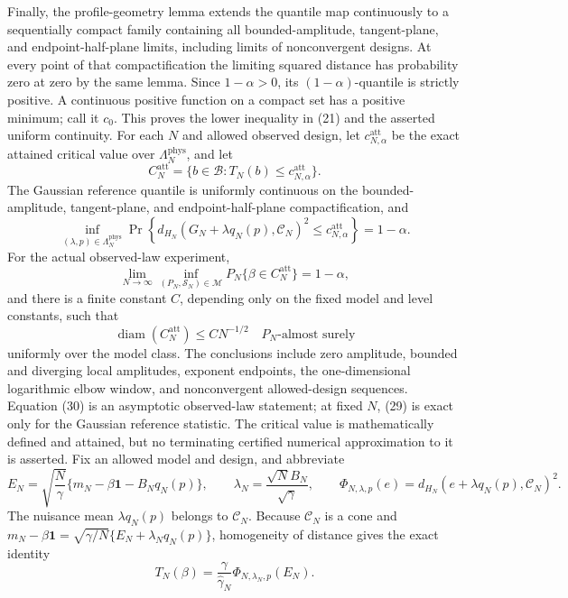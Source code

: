 Finally, the profile-geometry lemma extends the quantile map continuously to a sequentially compact family containing all bounded-amplitude, tangent-plane, and endpoint-half-plane limits, including limits of nonconvergent designs.  At every point of that compactification the limiting squared distance has probability zero at zero by the same lemma.  Since \(1-\alpha>0\), its \((1-\alpha)\)-quantile is strictly positive.  A continuous positive function on a compact set has a positive minimum; call it \(c_0\).  This proves the lower inequality in (21) and the asserted uniform continuity.
For each \(N\) and allowed observed design, let \(c_{N,\alpha}^{\mathrm{att}}\) be the exact attained critical value over \(\Lambda_N^{\mathrm{phys}}\), and let
\[
C_N^{\mathrm{att}}=\{b\in\mathcal B:T_N(b)\le c_{N,\alpha}^{\mathrm{att}}\}.
\]
The Gaussian reference quantile is uniformly continuous on the bounded-amplitude, tangent-plane, and endpoint-half-plane compactification, and
\[
\inf_{(\lambda,p)\in\Lambda_N^{\mathrm{phys}}}
\Pr\!\left\{d_{H_N}(G_N+\lambda q_N(p),\mathcal C_N)^2
\le c_{N,\alpha}^{\mathrm{att}}\right\}=1-\alpha.                           \tag{29}
\]
For the actual observed-law experiment,
\[
\lim_{N\to\infty}\inf_{(P_N,\mathcal S_N)\in\mathcal M}
P_N\{\beta\in C_N^{\mathrm{att}}\}=1-\alpha,                               \tag{30}
\]
and there is a finite constant \(C\), depending only on the fixed model and level constants, such that
\[
\operatorname{diam}(C_N^{\mathrm{att}})\le C N^{-1/2}\quad P_N\text{-almost surely}                              \tag{31}
\]
uniformly over the model class.  The conclusions include zero amplitude, bounded and diverging local amplitudes, exponent endpoints, the one-dimensional logarithmic elbow window, and nonconvergent allowed-design sequences.  Equation (30) is an asymptotic observed-law statement; at fixed \(N\), (29) is exact only for the Gaussian reference statistic.  The critical value is mathematically defined and attained, but no terminating certified numerical approximation to it is asserted.
Fix an allowed model and design, and abbreviate
\[
E_N=\sqrt{\frac N\gamma}\{m_N-\beta\mathbf1-B_Nq_N(p)\},
\qquad
\lambda_N=\frac{\sqrt N B_N}{\sqrt\gamma},
\qquad
\Phi_{N,\lambda,p}(e)
=d_{H_N}(e+\lambda q_N(p),\mathcal C_N)^2.                                   \tag{32}
\]
The nuisance mean \(\lambda q_N(p)\) belongs to \(\mathcal C_N\).  Because \(\mathcal C_N\) is a cone and \(m_N-\beta\mathbf1=\sqrt{\gamma/N}\{E_N+\lambda_Nq_N(p)\}\), homogeneity of distance gives the exact identity
\[
T_N(\beta)
=\frac{\gamma}{\widehat\gamma_N}
 \Phi_{N,\lambda_N,p}(E_N).                                                   \tag{33}
\]

